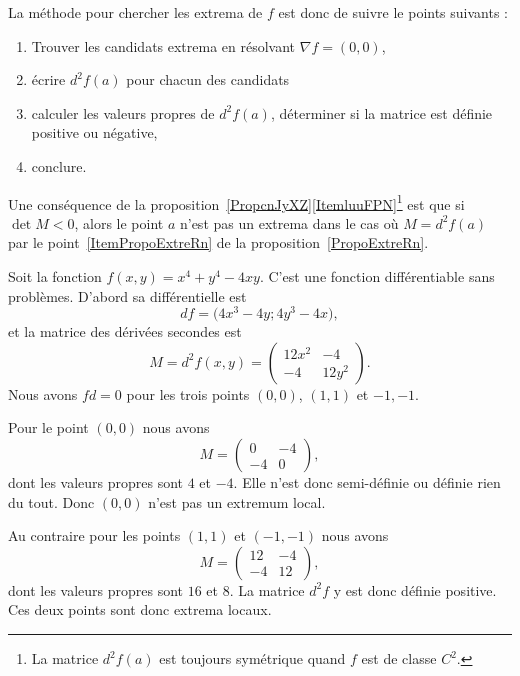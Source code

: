 La méthode pour chercher les extrema de $f$ est donc de suivre le points suivants :
\begin{enumerate}
    \item
        Trouver les candidats extrema en résolvant $\nabla f=(0,0)$,
    \item
        écrire $d^2f(a)$ pour chacun des candidats
    \item
        calculer les valeurs propres de $d^2f(a)$, déterminer si la matrice est définie positive ou négative,
    \item
        conclure.
\end{enumerate}

Une conséquence de la proposition~\ref{PropcnJyXZ}\ref{ItemluuFPN}\footnote{La matrice $d^2f(a)$ est toujours symétrique quand $f$ est de classe $C^2$.} est que si \( \det M<0\), alors le point \( a\) n'est pas  un extrema dans le cas où $M=d^2f(a)$ par le point~\ref{ItemPropoExtreRn} de la proposition~\ref{PropoExtreRn}.

\begin{example}
    Soit la fonction \( f(x,y)=x^4+y^4-4xy\). C'est une fonction différentiable sans problèmes. D'abord sa différentielle est
    \begin{equation}
        df=\big(4x^3-4y;4y^3-4x),
    \end{equation}
    et la matrice des dérivées secondes est
    \begin{equation}
        M=d^2f(x,y)=\begin{pmatrix}
            12x^2    &   -4    \\
            -4    &   12y^2
        \end{pmatrix}.
    \end{equation}
    Nous avons \( fd=0\) pour les trois points \( (0,0)\), \( (1,1)\) et \( -1,-1\).

    Pour le point \( (0,0)\) nous avons
    \begin{equation}
        M=\begin{pmatrix}
            0    &   -4    \\
            -4    &   0
        \end{pmatrix},
    \end{equation}
    dont les valeurs propres sont \( 4\) et \( -4\). Elle n'est donc semi-définie ou définie rien du tout. Donc \( (0,0)\) n'est pas un extremum local.

    Au contraire pour les points \( (1,1)\) et \( (-1,-1)\) nous avons
    \begin{equation}
        M=\begin{pmatrix}
            12    &   -4    \\
            -4    &   12
        \end{pmatrix},
    \end{equation}
    dont les valeurs propres sont \( 16\) et \( 8\). La matrice \( d^2f\) y est donc définie positive. Ces deux points sont donc extrema locaux.
\end{example}

